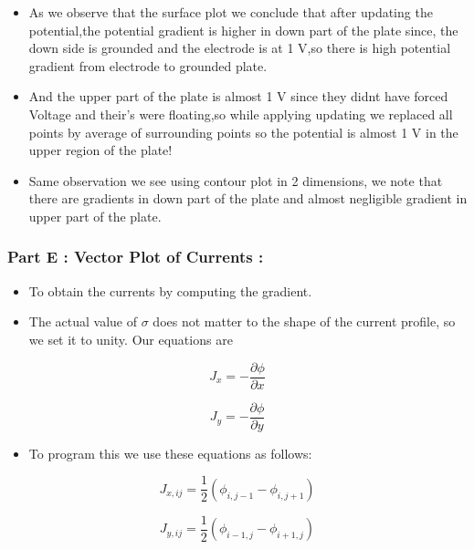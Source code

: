 \documentclass[11pt, a4paper]{article}
\begin{document}
\begin{itemize}
\item
  As we observe that the surface plot we conclude that after updating
  the potential,the potential gradient is higher in down part of the
  plate since, the down side is grounded and the electrode is at 1 V,so
  there is high potential gradient from electrode to grounded plate.
\item
  And the upper part of the plate is almost 1 V since they didnt have
  forced Voltage and their's were floating,so while applying updating we
  replaced all points by average of surrounding points so the potential
  is almost 1 V in the upper region of the plate!
\item
  Same observation we see using contour plot in 2 dimensions, we note
  that there are gradients in down part of the plate and almost
  negligible gradient in upper part of the plate.
\end{itemize}
\newpage
\subsubsection{Part E : Vector Plot of Currents
:}\label{part-e-vector-plot-of-currents}

\begin{itemize}
\item
  To obtain the currents by computing the gradient.
\item
  The actual value of \(\sigma\) does not matter to the shape of the
  current profile, so we set it to unity. Our equations are
\end{itemize}

\begin{equation}
    J_x = -\frac{\partial \phi}{\partial x} 
  \end{equation}

\begin{equation}
    J_y = -\frac{\partial \phi}{\partial y} 
  \end{equation}

\begin{itemize}
\item
  To program this we use these equations as follows:
\end{itemize}

\begin{equation}
        J_{x,ij} = \frac{1}{2}(\phi_{i,j-1} - \phi_{i,j+1}) 
    \end{equation}

\begin{equation}
        J_{y,ij} = \frac{1}{2}(\phi_{i-1,j} - \phi_{i+1,j}) 
    \end{equation}
  
\end{document}
